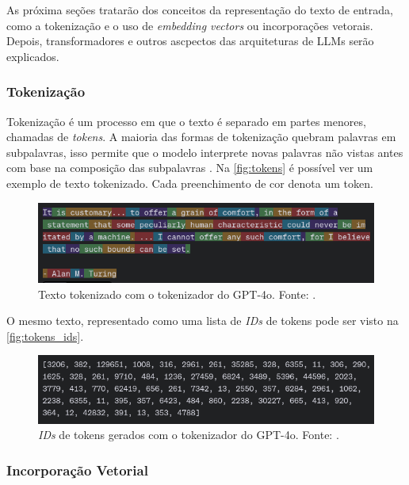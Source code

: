 As próxima seções tratarão dos conceitos da representação do texto de entrada, como a tokenização e o uso de \textit{embedding vectors} ou incorporações vetorais.
Depois, transformadores e outros ascpectos das arquiteturas de \acp{LLM} serão explicados.

\subsubsection{Tokenização}  %

Tokenização é um processo em que o texto é separado em partes menores, chamadas de \textit{tokens}. A maioria das formas de tokenização quebram palavras em subpalavras,
isso permite que o modelo interprete novas palavras não vistas antes com base na composição das subpalavras \cite{llm}. Na \autoref{fig:tokens} é possível ver um exemplo
de texto tokenizado. Cada preenchimento de cor denota um token.

\begin{figure}[ht]
      \centering
      \includegraphics[width=0.7\columnwidth,keepaspectratio]{images/tokens.png}
      \caption{\small Texto tokenizado com o tokenizador do \ac{GPT}-4o. Fonte: \textcite{tokenizer}.}
      \label{fig:tokens}
\end{figure}

O mesmo texto, representado como uma lista de \textit{IDs} de tokens pode ser visto na \autoref{fig:tokens_ids}.

\begin{figure}[ht]
      \centering
      \includegraphics[width=0.7\columnwidth,keepaspectratio]{images/tokens_ids.png}
      \caption{\small \textit{IDs} de tokens gerados com o tokenizador do \ac{GPT}-4o. Fonte: \textcite{tokenizer}.}
      \label{fig:tokens_ids}
\end{figure}

\subsubsection{Incorporação Vetorial}


